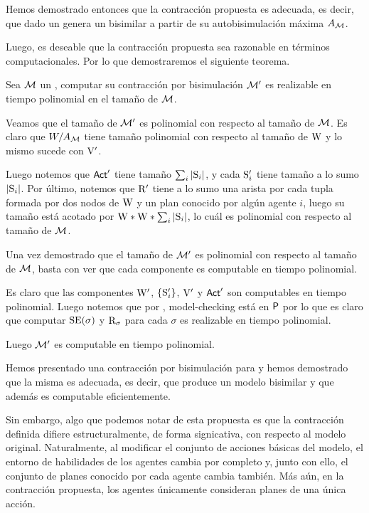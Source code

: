 Hemos demostrado entonces que la contracción propuesta es adecuada, es decir, que dado un \ults genera un \ults bisimilar a partir de su 
autobisimulación máxima $A_\modults$.

Luego, es deseable que la contracción propuesta sea razonable en términos computacionales. Por lo que demostraremos el siguiente teorema.


\begin{teorema}
    Sea $\modults$ un \ults, computar su contracción por bisimulación $\modults'$ es realizable en tiempo polinomial en el 
    tamaño de $\modults$.
\end{teorema}

\begin{demostracion}
    Veamos que el tamaño de $\modults'$ es polinomial con respecto al tamaño de $\modults$. Es claro que $W/A_\modults$ tiene tamaño polinomial con 
    respecto al tamaño de $\W$ y lo mismo sucede con $\V'$. 

    Luego notemos que $\ACT'$ tiene tamaño $\sum_{i} |\S_i|$, y cada $\S_i'$ tiene tamaño a lo sumo $|\S_i|$. Por último, notemos que $\R'$ tiene a lo 
    sumo una arista por cada tupla formada por dos nodos de $\W$ y un plan conocido por algún agente $i$, luego su tamaño está acotado por 
    $\W * \W * \sum_{i}|\S_i|$, lo cuál es polinomial con respecto al tamaño de $\modults$.

    Una vez demostrado que el tamaño de $\modults'$ es polinomial con respecto al tamaño de $\modults$, basta con ver que cada componente es computable en 
    tiempo polinomial. 

    Es claro que las componentes $\W'$, $\{\S_i'\}$, $\V'$ y $\ACT'$ son computables en tiempo polinomial. Luego notemos que por 
    , model-checking está en $\Poly$ por lo que es claro que computar $\sexec(\sigma)$ y $\R_\sigma$
    para cada $\sigma$ es realizable en tiempo polinomial.

    Luego $\modults'$ es computable en tiempo polinomial.
\end{demostracion}

Hemos presentado una contracción por bisimulación para \KHilogic y hemos demostrado que 
la misma es adecuada, es decir, que produce un modelo bisimilar y que además es computable eficientemente.

Sin embargo, algo que podemos notar de esta propuesta es que la contracción definida difiere estructuralmente, de 
forma signicativa, con respecto al modelo original. 
Naturalmente, al modificar el conjunto de acciones básicas del modelo, el entorno de habilidades de los agentes cambia por completo y, junto con ello, 
el conjunto de planes conocido por cada agente cambia también. Más aún, en la contracción propuesta, los agentes 
únicamente consideran planes de una única acción.

